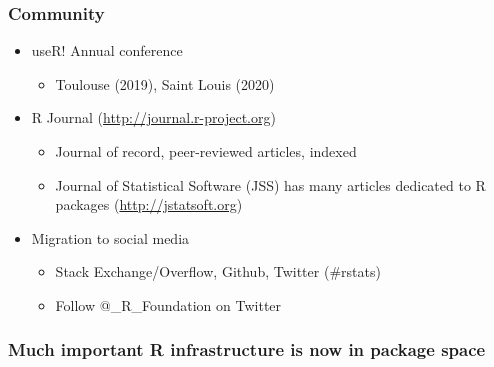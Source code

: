 \documentclass[svgnames]{beamer}
\begin{document}
\begin{frame}
  \frametitle{Community}
  \begin{itemize}
  \item useR! Annual conference
    \begin{itemize}
    \item Toulouse (2019), Saint Louis (2020)
    \end{itemize}
  \item R Journal (\url{http://journal.r-project.org})
    \begin{itemize}
    \item Journal of record, peer-reviewed articles, indexed
    \item Journal of Statistical Software (JSS) has many articles
      dedicated to R packages (\url{http://jstatsoft.org})
    \end{itemize}
  \item Migration to social media
    \begin{itemize}
    \item Stack Exchange/Overflow, Github, Twitter (\#rstats)
    \item Follow @\_R\_Foundation on Twitter
    \end{itemize}
  \end{itemize}
\end{frame}

\begin{frame}
  \frametitle{Much important R infrastructure is now in package space}

  \begin{center}
  \end{center}
    
\end{frame}
\end{document}
